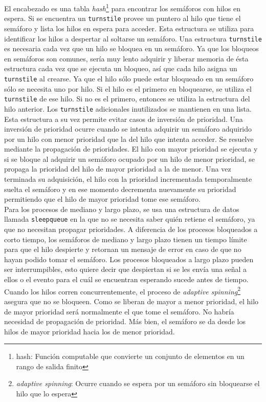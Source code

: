 \documentclass[a4paper]{book}
\begin{document}
El encabezado es una tabla \emph{hash}\footnote{hash: Funci\'on computable que convierte un conjunto de elementos en un rango de salida finito} para encontrar los semáforos con hilos en espera. Si se encuentra un \verb|turnstile| provee un puntero al hilo que tiene el semáforo y lista los hilos en espera para acceder. Esta estructura se utiliza para identificar los hilos a despertar al soltarse un semáforo. Una estructura \verb|turnstile| es necesaria cada vez que un hilo se bloquea en un semáforo. Ya que los bloqueos en semáforos son comunes, sería muy lento adquirir y liberar memoria de \'esta estructura cada vez que se ejecuta un bloqueo, así que cada hilo asigna un \verb|turnstile| al crearse. Ya que el hilo sólo puede estar bloqueado en un semáforo sólo se necesita uno por hilo. Si el hilo es el primero en bloquearse, se utiliza el \verb|turnstile| de ese hilo. Si no es el primero, entonces se utiliza la estructura del hilo anterior. Los \verb|turnstile| adicionales inutilizados se mantienen en una lista.\\

Esta estructura a su vez permite evitar casos de inversión de prioridad. Una inversión de prioridad ocurre cuando se intenta adquirir un semáforo adquirido por un hilo con menor prioridad que la del hilo que intenta acceder. Se resuelve mediante la propagación de prioridades. El hilo con mayor prioridad se ejecuta y si se bloque al adquirir un semáforo ocupado por un hilo de menor prioridad, se propaga la prioridad del hilo de mayor prioridad a la de menor. Una vez terminada su adquisici\'on, el hilo con la prioridad incrementada temporalmente suelta el semáforo y en ese momento decrementa nuevamente su prioridad permitiendo que el hilo de mayor prioridad tome ese semáforo.\\

Para los procesos de mediano y largo plazo, se usa una estructura de datos llamada \verb|sleepqueue| en la que no se necesita saber quién retiene el semáforo, ya que no necesitan propagar prioridades.
A diferencia de los procesos bloqueados a corto tiempo, los semáforos de mediano y largo plazo tienen un tiempo límite para que el hilo despierte y retornan un mensaje de error en caso de que no hayan podido tomar el semáforo. Los procesos bloqueados a largo plazo pueden ser interrumpibles, esto quiere decir que despiertan si se les env\'ia una señal a ellos o el evento para el cuál se encuentran esperando sucede antes de tiempo.\\

Cuando los hilos corren concurrentemente, el proceso de \emph{adaptive spinning}\footnote{\emph{adaptive spinning}: Ocurre cuando se espera por un sem\'aforo sin bloquearse el hilo que lo espera} asegura que no se bloqueen. Como se liberan de mayor a menor prioridad, el hilo de mayor prioridad será normalmente el que tome el semáforo. No habría necesidad de propagación de prioridad. Más bien, el semáforo se da desde los hilos de mayor prioridad hacia los de menor prioridad.
\end{document}
